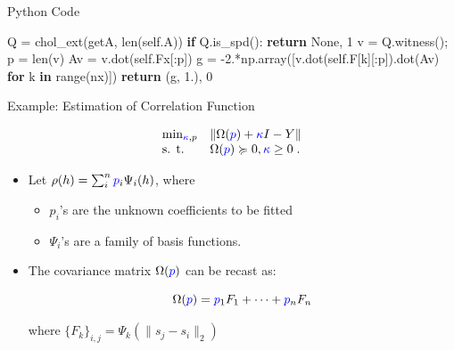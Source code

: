 \documentclass[10pt,ignorenonframetext,serif,onlymath]{beamer}
\newenvironment{Shaded}{}{}
\newcommand{\BuiltInTok}[1]{#1}
\newcommand{\ControlFlowTok}[1]{\textcolor[rgb]{0.00,0.44,0.13}{\textbf{#1}}}
\newcommand{\DecValTok}[1]{\textcolor[rgb]{0.25,0.63,0.44}{#1}}
\newcommand{\FloatTok}[1]{\textcolor[rgb]{0.25,0.63,0.44}{#1}}
\newcommand{\KeywordTok}[1]{\textcolor[rgb]{0.00,0.44,0.13}{\textbf{#1}}}
\newcommand{\NormalTok}[1]{#1}
\newcommand{\OperatorTok}[1]{\textcolor[rgb]{0.40,0.40,0.40}{#1}}
\newcommand{\VariableTok}[1]{\textcolor[rgb]{0.10,0.09,0.49}{#1}}
\providecommand{\tightlist}{%
  \setlength{\itemsep}{0pt}\setlength{\parskip}{0pt}}
\begin{document}
\begin{frame}[fragile]{Python Code}
\begin{Shaded}
\begin{Highlighting}[]
\NormalTok{        Q }\OperatorTok{=}\NormalTok{ chol_ext(getA, }\BuiltInTok{len}\NormalTok{(}\VariableTok{self}\NormalTok{.A))}
        \ControlFlowTok{if}\NormalTok{ Q.is_spd(): }\ControlFlowTok{return} \VariableTok{None}\NormalTok{, }\DecValTok{1}
\NormalTok{        v }\OperatorTok{=}\NormalTok{ Q.witness()}\OperatorTok{;}\NormalTok{ p }\OperatorTok{=} \BuiltInTok{len}\NormalTok{(v)}
\NormalTok{        Av }\OperatorTok{=}\NormalTok{ v.dot(}\VariableTok{self}\NormalTok{.Fx[:p])}
\NormalTok{        g }\OperatorTok{=} \FloatTok{-2.}\OperatorTok{*}\NormalTok{np.array([v.dot(}\VariableTok{self}\NormalTok{.F[k][:p]).dot(Av)}
                          \ControlFlowTok{for}\NormalTok{ k }\KeywordTok{in} \BuiltInTok{range}\NormalTok{(nx)])}
        \ControlFlowTok{return}\NormalTok{ (g, }\FloatTok{1.}\NormalTok{), }\DecValTok{0}
\end{Highlighting}
\end{Shaded}

\end{frame}

\begin{frame}{Example: Estimation of Correlation Function}
\protect\hypertarget{example-estimation-of-correlation-function}{}

\[\begin{array}{ll}
   \min_{{\color{blue}\kappa}, p}   & \| \Omega({\color{blue}p}) + {\color{blue}\kappa} I - Y \| \\
   \text{s. t.} & \Omega({\color{blue}p}) \succcurlyeq 0,  {\color{blue}\kappa} \geq 0 \; .\\
 \end{array}\]

\begin{itemize}
\item
  Let \(\rho(h) = \sum_i^n {\color{blue}p}_i \Psi_i(h)\), where

  \begin{itemize}
  \tightlist
  \item
    \(p_i\)’s are the unknown coefficients to be fitted
  \item
    \(\Psi_i\)’s are a family of basis functions.
  \end{itemize}
\item
  The covariance matrix \(\Omega({\color{blue}p})\) can be recast as:

  \[\Omega({\color{blue}p}) = {\color{blue}p}_1 F_1 + \cdots + {\color{blue}p}_n F_n\]

  where \(\{F_k\}_{i,j} =\Psi_k( \| s_j - s_i \|_2)\)
\end{itemize}

\end{frame}
\end{document}
